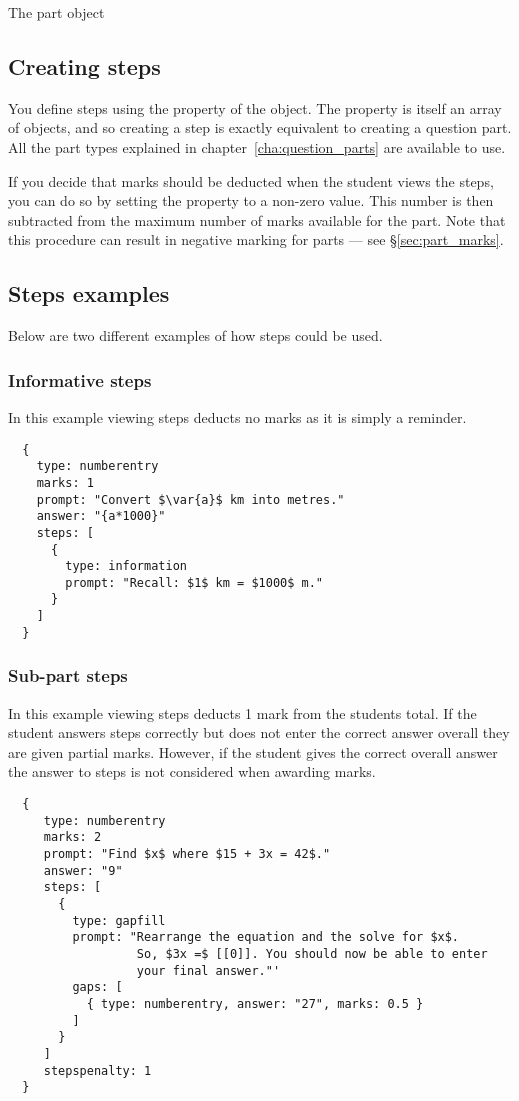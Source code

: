 \begin{chapter}{\label{cha:part_object}The part object}
  \subsection{Creating steps}
  You define steps using the  property of the 
  object.  The  property is itself an array of
   objects, and so creating a step is exactly equivalent to
  creating a question part.  All the part types explained in
  chapter~\ref{cha:question_parts} are available to use.

  If you decide that marks should be deducted when the student views the
  steps, you can do so by setting the  property to a
  non-zero value.  This number is then subtracted from the maximum number of
  marks available for the part.  Note that this procedure can result in
  negative marking for parts --- see \S\ref{sec:part_marks}.
  
  \subsection{Steps examples}
  Below are two different examples of how steps could be used.
  
  \subsubsection{Informative steps}
  In this example viewing steps deducts no marks as it is simply a reminder.
  \begin{Verbatim}
  {
    type: numberentry
    marks: 1
    prompt: "Convert $\var{a}$ km into metres."
    answer: "{a*1000}"
    steps: [
      {
        type: information
        prompt: "Recall: $1$ km = $1000$ m."
      }
    ]		
  } 
  \end{Verbatim}
  
  \subsubsection{Sub-part steps}  
  In this example viewing steps deducts 1 mark from the students total. If the student answers 
  steps correctly but does not enter the correct answer overall they are given partial marks. 
  However, if the student gives the correct overall answer the answer to steps is not considered 
  when awarding marks. 
  \begin{Verbatim}
  {
     type: numberentry
     marks: 2
     prompt: "Find $x$ where $15 + 3x = 42$."
     answer: "9"
     steps: [
       {
         type: gapfill
  	     prompt: "Rearrange the equation and the solve for $x$. 
  	              So, $3x =$ [[0]]. You should now be able to enter
  	              your final answer."'
  	     gaps: [
  	       { type: numberentry, answer: "27", marks: 0.5 }
  	     ]
       }
     ]
     stepspenalty: 1
  }				
  \end{Verbatim}	
  
\end{chapter}
